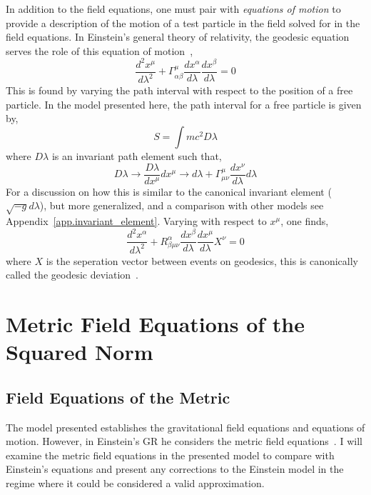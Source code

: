 \documentclass[aps,prd,preprint]{revtex4-1}
\begin{document}
In addition to the field equations, one must pair with {\it equations of motion\/} to provide a description of the motion of a test particle in the field solved for in the field equations. In Einstein's general theory of relativity, the geodesic equation serves the role of this equation of motion~\cite{hauser_2019_1,hauser_2019_2,hauser_2019_3},
\begin{equation}\label{geodesic_equation}
    \frac{d^2x^\mu}{d\lambda^2} + \Gamma^{\mu}_{\alpha\beta}\frac{dx^\alpha}{d\lambda}\frac{dx^\beta}{d\lambda} = 0
\end{equation}
This is found by varying the path interval with respect to the position of a free particle. In the model presented here, the path interval for a free particle is given by,
\begin{equation}\label{free_particle_action}
    S = \int mc^2 D\lambda
\end{equation}
where $D\lambda$ is an invariant path element such that,
\begin{equation}
    D\lambda \rightarrow \frac{D\lambda}{dx^\mu}dx^{\mu} \rightarrow d\lambda + \Gamma^{\mu}_{\mu\nu}\frac{dx^{\nu}}{d\lambda}d\lambda
\end{equation}
For a discussion on how this is similar to the canonical invariant element ($\sqrt{-g}d\lambda$), but more generalized, and a comparison with other models see Appendix~\ref{app.invariant_element}. Varying with respect to $x^{\mu}$, one finds,
\begin{equation}\label{geodesic_deviation}
    \frac{d^2 x^\alpha}{d\lambda^2} + R^{\alpha}_{\beta\mu\nu}\frac{dx^\beta}{d\lambda}\frac{dx^\mu}{d\lambda}X^{\nu} = 0
\end{equation}
where $X$ is the seperation vector between events on geodesics, this is canonically called the geodesic deviation~\cite{philipp_2015,ganiou_2016}.

\section{Metric Field Equations of the Squared Norm}
\subsection*{Field Equations of the Metric}
The model presented establishes the gravitational field equations and equations of motion. However, in Einstein's GR he considers the metric field equations~\cite{Einstein_1915,Einstein_1916}. I will examine the metric field equations in the presented model to compare with Einstein's equations and present any corrections to the Einstein model in the regime where it could be considered a valid approximation.
\end{document}

